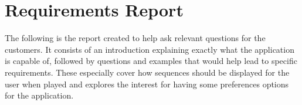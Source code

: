 \chapter{Requirements Report}\label{app:reqquestion}
The following is the report created to help ask relevant questions for the customers. It consists of an introduction explaining exactly what the application is capable of, followed by questions and examples that would help lead to specific requirements. These especially cover how sequences should be displayed for the user when played and explores the interest for having some preferences options for the application.



